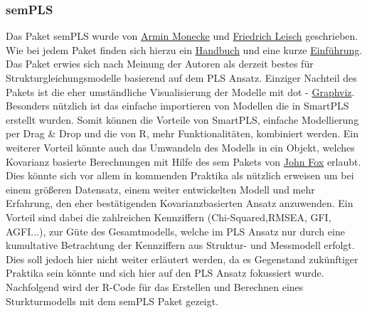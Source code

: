 \documentclass{article}\usepackage[]{graphicx}\usepackage[]{color}
\begin{document}
\subsubsection{semPLS}
Das Paket semPLS\cite{semPLS} wurde von \href{Armin.Monecke@stat.uni-muenchen.de}{Armin Monecke} und \href{Friedrich.Leisch@R-project.org}{Friedrich Leisch} geschrieben. Wie bei jedem Paket finden sich hierzu ein \href{http://cran.r-project.org/web/packages/semPLS/semPLS.pdf}{Handbuch} und eine kurze \href{http://cran.r-project.org/web/packages/semPLS/vignettes/semPLS-intro.pdf}{Einführung}.\\
Das Paket erwies sich nach Meinung der Autoren als derzeit bestes für Strukturgleichungsmodelle basierend auf dem PLS Ansatz. Einziger Nachteil des Pakets ist die eher umständliche Visualisierung der Modelle mit dot - \href{http://www.graphviz.org/}{Graphviz}. Besonders nützlich ist das einfache importieren von Modellen die in SmartPLS erstellt wurden. Somit können die Vorteile von SmartPLS, einfache Modellierung per Drag \& Drop und die von R, mehr Funktionalitäten, kombiniert werden. Ein weiterer Vorteil könnte auch das Umwandeln des Modells in ein Objekt, welches Kovarianz basierte Berechnungen mit Hilfe des sem Pakets von \href{jfox@mcmaster.ca}{John Fox} erlaubt. Dies könnte sich vor allem in kommenden Praktika als nützlich erweisen um bei einem größeren Datensatz, einem weiter entwickelten Modell und mehr Erfahrung, den eher bestätigenden Kovarianzbasierten Ansatz anzuwenden. Ein Vorteil sind dabei die zahlreichen Kennziffern (Chi-Squared,RMSEA, GFI, AGFI...), zur Güte des Gesamtmodells, welche im PLS Ansatz nur durch eine kumultative Betrachtung der Kennziffern aus Struktur- und Messmodell erfolgt. Dies soll jedoch hier nicht weiter erläutert werden, da es Gegenstand zukünftiger Praktika sein könnte und sich hier auf den PLS Ansatz fokussiert wurde. Nachfolgend wird der R-Code für das Erstellen und Berechnen eines Sturkturmodells mit dem semPLS Paket gezeigt.
\end{document}
